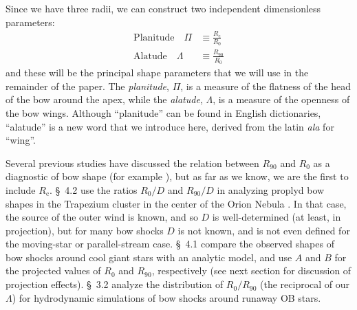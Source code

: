 \documentclass[useAMS, usenatbib, a4paper]{mnras}
\newcommand\C{\ensuremath{\mathrm{c}}}
\begin{document}
Since we have three radii, we can construct two independent
dimensionless parameters:
\begin{align}
  \label{eq:planitude}
  \text{Planitude} \quad \Pi & \equiv  \frac{R_{\C}} {R_0} \\
  \label{eq:alatude}
  \text{Alatude} \quad \Lambda & \equiv  \frac{R_{90}} {R_0}
\end{align}
and these will be the principal shape parameters that we will use in
the remainder of the paper.  The \textit{planitude}, \(\Pi\), is a
measure of the flatness of the head of the bow around the apex, while
the \textit{alatude}, \(\Lambda\), is a measure of the openness of the bow
wings.  Although ``planitude'' can be found in English dictionaries,
``alatude'' is a new word that we introduce here, derived from the
latin \textit{ala} for ``wing''.

Several previous studies have discussed the relation between
\(R_{90}\) and \(R_0\) as a diagnostic of bow shape (for example
\citealp{Robberto:2005, Cox:2012a, Meyer:2016a}), but as far as we
know, we are the first to include \(R_{\C}\).  \citet{Robberto:2005}
\S~4.2 use the ratios \(R_0/D\) and \(R_{90}/D\) in analyzing proplyd
bow shapes in the Trapezium cluster in the center of the Orion Nebula
\citep{Hayward:1994a, Garcia-Arredondo:2001a, Smith:2005a}.  In that
case, the source of the outer wind is known, and so \(D\) is
well-determined (at least, in projection), but for many bow shocks
\(D\) is not known, and is not even defined for the moving-star or
parallel-stream case. \citet{Cox:2012a} \S~4.1 compare the observed
shapes of bow shocks around cool giant stars with an analytic model,
and use \(A\) and \(B\) for the projected values of \(R_0\) and
\(R_{90}\), respectively (see next section for discussion of
projection effects).  \citet{Meyer:2016a} \S~3.2 analyze the
distribution of \(R_0 / R_{90}\) (the reciprocal of our \(\Lambda\)) for
hydrodynamic simulations of bow shocks around runaway OB stars.

\end{document}
